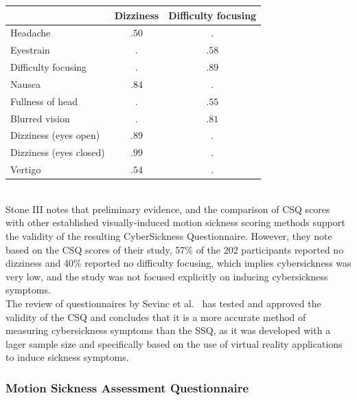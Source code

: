 \begin{center}
    \begin{tabular}{ l c c}
        \toprule
        \textbf{} & \textbf{Dizziness} & \textbf{Difficulty focusing} \\
        \midrule
        Headache                & $.50$ & $.$   \\
        Eyestrain               & $.$   & $.58$ \\
        Difficulty focusing     & $.$   & $.89$ \\
        Nausea                  & $.84$ & $.$   \\
        Fullness of head        & $.$   & $.55$ \\
        Blurred vision          & $.$   & $.81$ \\
        Dizziness (eyes open)   & $.89$ & $.$   \\
        Dizziness (eyes closed) & $.99$ & $.$   \\
        Vertigo                 & $.54$ & $.$   \\
        \bottomrule
    \end{tabular}
    \label{tab:csq-scoring}
\end{center}
\\
Stone III notes that preliminary evidence, and the comparison of CSQ scores with other established visually-induced
motion sickness scoring methods support the validity of the resulting CyberSickness Questionnaire.
However, they note based on the CSQ scores of their study, 57\% of the 202 participants reported no dizziness and 40\%
reported no difficulty focusing, which implies cybersickness was very low, and the study was not focused
explicitly on inducing cybersickness symptoms.
\\
The review of questionnaires by Sevinc et al.~\cite{Sevinc2020} has tested and approved the validity of the CSQ and
concludes that it is a more accurate method of measuring cybersickness symptoms than the SSQ, as it was developed
with a lager sample size and specifically based on the use of virtual reality applications to induce sickness symptoms.

\subsubsection{Motion Sickness Assessment Questionnaire}\label{subsubsec:motion-sickness-assessment-questionnaire}

